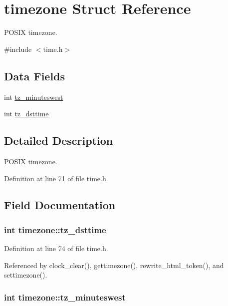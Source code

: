 \hypertarget{structtimezone}{\section{timezone Struct Reference}
\label{structtimezone}
}


P\-O\-S\-I\-X timezone.  




{\ttfamily \#include $<$time.\-h$>$}

\subsection*{Data Fields}
\begin{DoxyCompactItemize}
\item 
int \hyperlink{structtimezone_a3042f7eff6e1b980728def76b1fa0eb7}{tz\-\_\-minuteswest}
\item 
int \hyperlink{structtimezone_a85259977aeb63b17e6ce94f19afdfd99}{tz\-\_\-dsttime}
\end{DoxyCompactItemize}


\subsection{Detailed Description}
P\-O\-S\-I\-X timezone. 

Definition at line 71 of file time.\-h.



\subsection{Field Documentation}
\hypertarget{structtimezone_a85259977aeb63b17e6ce94f19afdfd99}{
\subsubsection[{tz\-\_\-dsttime}]{\setlength{\rightskip}{0pt plus 5cm}int timezone\-::tz\-\_\-dsttime}}\label{structtimezone_a85259977aeb63b17e6ce94f19afdfd99}


Definition at line 74 of file time.\-h.



Referenced by clock\-\_\-clear(), gettimezone(), rewrite\-\_\-html\-\_\-token(), and settimezone().

\hypertarget{structtimezone_a3042f7eff6e1b980728def76b1fa0eb7}{
\subsubsection[{tz\-\_\-minuteswest}]{\setlength{\rightskip}{0pt plus 5cm}int timezone\-::tz\-\_\-minuteswest}}\label{structtimezone_a3042f7eff6e1b980728def76b1fa0eb7}


